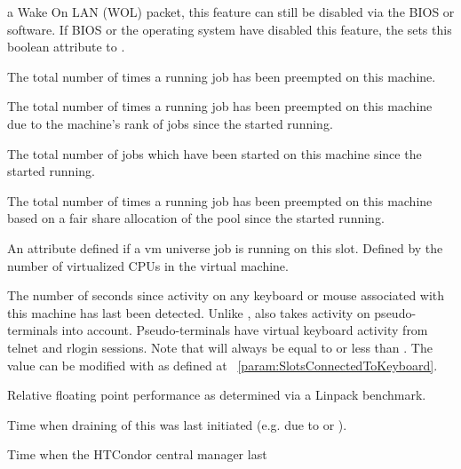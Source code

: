 \begin{description}
a Wake On LAN (WOL) packet,
this feature can still be disabled via the BIOS or software.
If BIOS or the operating system have disabled this feature, 
the  sets this boolean attribute to .
%
\item[\AdAttr{JobPreemptions}:] The total number of times
a running job has been preempted on this machine.  
%
\item[\AdAttr{JobRankPreemptions}:] The total number of times
a running job has been preempted on this machine due to the machine's
rank of jobs since the  started running.  
%
\item[\AdAttr{JobStarts}:] The total number of jobs which
have been started on this machine since the  started running.
%
\item[\AdAttr{JobUserPrioPreemptions}:] The total number of times
a running job has been preempted on this machine based on a fair share
allocation of the pool 
since the  started running.  
%
\item[\AdAttr{JobVM\_VCPUS}:] An attribute defined if a vm universe job
is running on this slot.  Defined by the number of virtualized CPUs
in the virtual machine.
%
\item[\AdAttr{KeyboardIdle}:] The number of seconds since activity on any
keyboard or mouse associated with this machine has last been detected.
Unlike ,  also takes activity 
on pseudo-terminals into
account.
Pseudo-terminals have virtual keyboard activity from telnet and rlogin
sessions.  Note that  will always be equal to or
less than .
The value can be modified with 
as defined at ~\ref{param:SlotsConnectedToKeyboard}.
%
\item[\AdAttr{KFlops}:] Relative floating point performance as determined via a
Linpack benchmark.
%
\item[\AdAttr{LastDrainStartTime}:] Time when draining of this
 was last initiated (e.g. due to  or
).
%
\item[\AdAttr{LastHeardFrom}:] Time when the HTCondor central manager last

\end{description}
